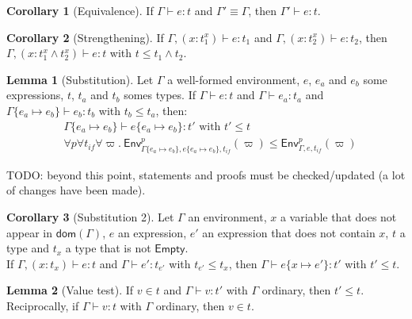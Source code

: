 \documentclass[a4paper]{article}%
\newcommand{\dom}[1]{\textsf{dom}(#1)}
\newcommand{\Empty} {\textsf{Empty}}%
\newcommand{\subst}[2]{\{#1 \mapsto #2\}}
\newcommand{\Gp}[2]{\textsf{Env}^{#1}_{#2}}
\theoremstyle{definition}
\newtheorem{lemma}{Lemma}
\newtheorem{corollary}{Corollary}
\begin{document}
        \begin{corollary}[Equivalence]
          If $\Gamma \vdash e:t$ and $\Gamma' \equiv \Gamma$, then $\Gamma' \vdash e:t$.
        \end{corollary}
    
        \begin{corollary}[Strengthening]
          If $\Gamma, (x:t_1^x) \vdash e:t_1$ and $\Gamma, (x:t_2^x) \vdash e:t_2$, then
          $\Gamma, (x:t_1^x\land t_2^x) \vdash e:t$ with $t \leq t_1\land t_2$.
        \end{corollary}
    
        \begin{lemma}[Substitution]
          Let $\Gamma$ a well-formed environment, $e$, $e_a$ and $e_b$ some expressions, $t$, $t_a$ and $t_b$ somes types.
          If $\Gamma \vdash e:t$ and $\Gamma \vdash e_a : t_a$ and $\Gamma\subst {e_a} {e_b} \vdash e_b:t_b$ with $t_b \leq t_a$, then:
          \begin{align*}
            &\Gamma \subst {e_a} {e_b} \vdash e \subst {e_a} {e_b}:t' \text{ with } t'\leq t\\
            &\forall p \forall t_{if} \forall \varpi.\ \Gp p {\Gamma\subst {e_a} {e_b},e\subst {e_a} {e_b},t_{if}} (\varpi) \leq \Gp p {\Gamma,e,t_{if}} (\varpi)
          \end{align*}
        \end{lemma}
    
        TODO: beyond this point, statements and proofs must be checked/updated (a lot of changes have been made).

        \begin{corollary}[Substitution 2]
          Let $\Gamma$ an environment, $x$ a variable that does not appear in $\dom \Gamma$, $e$ an expression, $e'$ an expression that does not contain $x$, $t$ a type and $t_x$ a type that is not $\Empty$.\\
          If $\Gamma, (x:t_x) \vdash e:t$ and $\Gamma \vdash e':t_{e'}$ with $t_{e'} \leq t_x$, then $\Gamma \vdash e \subst x {e'}:t'$ with $t'\leq t$.
        \end{corollary}
    
        \begin{lemma}[Value test]
          If $v \in t$ and $\Gamma \vdash v : t'$ with $\Gamma$ ordinary, then $t' \leq t$.
          Reciprocally, if $\Gamma \vdash v : t$ with $\Gamma$ ordinary, then $v \in t$.
        \end{lemma}
    
\end{document}
